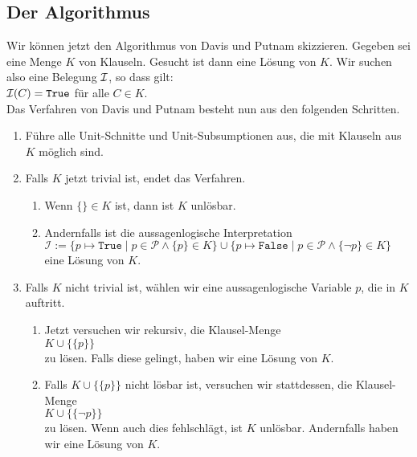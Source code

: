 \subsection{Der Algorithmus}
Wir können jetzt den Algorithmus von Davis und Putnam  skizzieren.
Gegeben sei eine Menge $K$ von Klauseln.  Gesucht ist dann eine Lösung von $K$.  Wir
suchen  also eine Belegung $\mathcal{I}$, so dass gilt: \\[0.2cm]
\hspace*{1.3cm} $\mathcal{I}(C) = \texttt{True}$ \quad für alle $C \in K$.\\[0.2cm]
Das Verfahren von Davis und Putnam besteht nun aus den folgenden Schritten.
\begin{enumerate}
\item Führe alle Unit-Schnitte und Unit-Subsumptionen aus, die mit Klauseln aus $K$ möglich sind.
\item Falls $K$ jetzt trivial ist, endet das Verfahren.
     \begin{enumerate}
     \item Wenn $\{\} \in K$ ist, dann ist $K$ unlösbar.
     \item Andernfalls ist die aussagenlogische Interpretation 
           \\[0.2cm]
           \hspace*{1.3cm}
           $\mathcal{I} := \bigl\{ p \mapsto \mathtt{True}  \mid p \in \mathcal{P} \wedge \{p\}\in K\bigr\} \cup
                           \bigl\{ p \mapsto \mathtt{False} \mid p \in \mathcal{P} \wedge \{\neg p\}\in K\bigr\}  $
           \\[0.2cm]
           eine Lösung von $K$.     
     \end{enumerate}
\item Falls $K$ nicht trivial ist, wählen wir eine aussagenlogische Variable $p$, die in $K$ auftritt.
      \begin{enumerate}
      \item Jetzt versuchen  wir rekursiv,  die Klausel-Menge \\[0.2cm]
            \hspace*{1.3cm}  $K \cup \bigl\{\{p\}\bigr\}$ \\[0.2cm]
            zu lösen. Falls diese gelingt, haben wir eine Lösung von $K$.
      \item Falls $K \cup \bigl\{\{p\}\bigr\}$ nicht lösbar ist, versuchen wir stattdessen, die Klausel-Menge
            \\[0.2cm] 
            \hspace*{1.3cm} $K \cup \bigl\{\{\neg p\}\bigr\}$
            \\[0.2cm]
            zu lösen.  Wenn auch dies fehlschlägt, ist $K$ unlösbar.  Andernfalls
            haben wir eine Lösung von $K$.
      \end{enumerate}
\end{enumerate}
